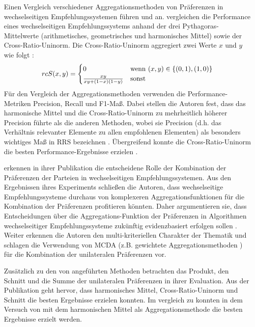 Einen Vergleich verschiedener Aggregationsmethoden von Präferenzen in wechselseitigen Empfehlungssystemen führen \textcite[S. 4031ff.]{neve:inproceedings} und \textcite[S. 1ff.]{kumari:2:inproceedings} an.
\textcite[S. 4031ff.]{neve:inproceedings} vergleichen die Performance eines wechselseitigen Empfehlungssystems anhand der drei Pythagoras-Mittelwerte (arithmetisches, geometrisches und harmonisches Mittel) sowie der Cross-Ratio-Uninorm.
Die Cross-Ratio-Uni\-norm aggregiert zwei Werte $x$ und $y$ wie folgt \cite[S. 19]{appel:article}:
\begin{equation}\label{eq35}
    rcS(x,y) =
        \begin{cases}
            0 & \textnormal{wenn } (x,y) \in \{(0,1),(1,0)\} \\
            \frac{xy}{xy + (1-x) (1-y)} & \textnormal{sonst } \\
        \end{cases}
\end{equation}
Für den Vergleich der Aggregationsmethoden verwenden \textcite[S. 4034]{neve:inproceedings} die Performance-Metriken Precision, Recall und F1-Maß.
Dabei stellen die Autoren fest, dass das harmonische Mittel und die Cross-Ratio-Uninorm zu mehrheitlich höherer Precision führte als die anderen Methoden, wobei sie Precision (d.h. das Verhältnis relevanter Elemente zu allen empfohlenen Elementen) als besonders wichtiges Maß in \ac{RRS} bezeichnen \cite[S. 4035]{neve:inproceedings}.
Übergreifend konnte die Cross-Ratio-Uninorm die besten Performance-Ergebnisse erzielen \cite[S. 4035]{neve:inproceedings}.

\textcite[S. 4031]{neve:inproceedings} erkennen in ihrer Publikation die entscheidene Rolle der Kombination der Präferenzen der Parteien in wechselseitigen Empfehlungssystemen.
Aus den Ergebnissen ihres Experiments schließen die Autoren, dass wechselseitige Empfehlungssysteme durchaus von komplexeren Aggregationsfunktionen für die Kombination der Präferenzen profitieren könnten.
Daher argumentieren sie, dass Entscheidungen über die Aggregations-Funktion der Präferenzen in Algorithmen wechselseitiger Empfehlungssysteme zukünftig evidenzbasiert erfolgen sollen \cite[S. 4032]{neve:inproceedings}.
Weiter erkennen die Autoren den multi-kriteriellen Charakter der Thematik und schlagen die Verwendung von \ac{MCDA} (z.B. gewichtete Aggregationsmethoden \cite[S. 4036]{neve:inproceedings}) für die Kombination der unilateralen Präferenzen vor.

Zusätzlich zu den von \textcite[S. 4031ff.]{neve:inproceedings} angeführten Methoden betrachten \textcite[S. 1ff.]{kumari:2:inproceedings} das Produkt, den Schnitt und die Summe der unilateralen Präferenzen in ihrer Evaluation.
Aus der Publikation geht hervor, dass harmonisches Mittel, Cross-Ratio-Uninorm und Schnitt die besten Ergebnisse erzielen konnten.
Im vergleich zu \textcite[S. 4031ff.]{neve:inproceedings} konnten in dem Versuch von \textcite[S. 5]{kumari:2:inproceedings} mit dem harmonischen Mittel als Aggregationsmethode die besten Ergebnisse erzielt werden.


